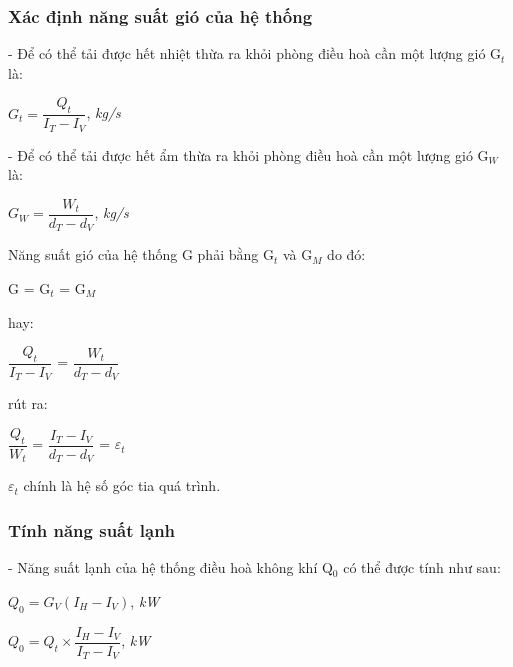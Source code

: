 \subsubsection{Xác định năng suất gió của hệ thống}
\hspace{1cm}- Để có thể tải được hết nhiệt thừa ra khỏi phòng điều hoà cần một lượng gió G$_{t}$ là:

\begin{center}
	$ G_{t} = \dfrac{Q_{t}}{I_{T} - I_{V}} $, \textit{kg/s}
\end{center}

- Để có thể tải được hết ẩm thừa ra khỏi phòng điều hoà cần một lượng gió G$_{W}$ là:

\begin{center}
	$ G_{W} = \dfrac{W_{t}}{d_{T} - d_{V}} $, \textit{kg/s}
\end{center}

Năng suất gió của hệ thống G phải bằng G$_{t}$ và G$_{M}$ do đó:

\begin{center}
	G = G$_{t}$ = G$_{M}$
\end{center}

hay:

\begin{center}
	$ \dfrac{Q_{t}}{I_{T} - I_{V}} $ = $\dfrac{W_{t}}{d_{T} - d_{V}} $
\end{center}

rút ra:

\begin{center}
	$ \dfrac{Q_{t}}{W_{t}} $ = $ \dfrac{I_{T} - I_{V}}{d_{T} - d_{V}} $ = {\Large $\varepsilon_{t}$}
\end{center}

{\Large $\varepsilon_{t}$} chính là hệ số góc tia quá trình.

\subsubsection{Tính năng suất lạnh}
\hspace{1cm}- Năng suất lạnh của hệ thống điều hoà không khí Q$ _{0} $ có thể được tính như sau:

\begin{center}
	$Q _{0} = G_{V}(I_{H} - I_{V})$, \textit{kW}
\end{center}
\begin{center}
	$ Q _{0} = Q_{t}\times\dfrac{I_{H} - I_{V}}{I_{T} - I_{V}}$, \textit{kW}
\end{center}

